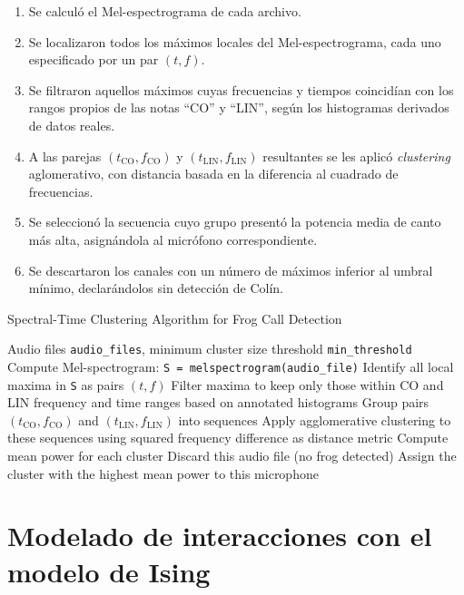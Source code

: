 \begin{enumerate}
  \item Se calculó el Mel-espectrograma de cada archivo.
  \item Se localizaron todos los máximos locales del Mel-espectrograma, cada uno especificado por un par \((t,f)\).
  \item Se filtraron aquellos máximos cuyas frecuencias y tiempos coincidían con los rangos propios de las notas “CO” y “LIN”, según los histogramas derivados de datos reales.
  \item A las parejas \((t_{\mathrm{CO}},f_{\mathrm{CO}})\) y \((t_{\mathrm{LIN}},f_{\mathrm{LIN}})\) resultantes se les aplicó \textit{clustering} aglomerativo, con distancia basada en la diferencia al cuadrado de frecuencias.
  \item Se seleccionó la secuencia cuyo grupo presentó la potencia media de canto más alta, asignándola al micrófono correspondiente.
  \item Se descartaron los canales con un número de máximos inferior al umbral mínimo, declarándolos sin detección de Colín.
\end{enumerate}


\begin{algorithm}[H]
\caption{Spectral-Time Clustering Algorithm for Frog Call Detection}
\begin{algorithmic}[1]
\Require Audio files \texttt{audio\_files}, minimum cluster size threshold \texttt{min\_threshold}
    \State Compute Mel-spectrogram: \texttt{S = melspectrogram(audio\_file)}
    \State Identify all local maxima in \texttt{S} as pairs $(t, f)$
    \State Filter maxima to keep only those within CO and LIN frequency and time ranges based on annotated histograms
    \State Group pairs $(t_{\text{CO}}, f_{\text{CO}})$ and $(t_{\text{LIN}}, f_{\text{LIN}})$ into sequences
    \State Apply agglomerative clustering to these sequences using squared frequency difference as distance metric
    \State Compute mean power for each cluster
        \State Discard this audio file (no frog detected)
    \Else
        \State Assign the cluster with the highest mean power to this microphone
    \EndIf
\EndFor
\end{algorithmic}
\end{algorithm}



\section{Modelado de interacciones con el modelo de Ising}
\label{sec:modelado_ising}



